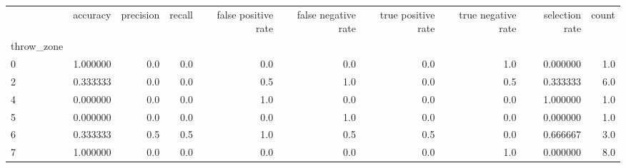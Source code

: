 \begin{tabular}{lrrrrrrrrr}
\toprule
{} &  accuracy &  precision &  recall &  false positive rate &  false negative rate &  true positive rate &  true negative rate &  selection rate &  count \\
throw\_zone &           &            &         &                      &                      &                     &                     &                 &        \\
\midrule
0          &  1.000000 &        0.0 &     0.0 &                  0.0 &                  0.0 &                 0.0 &                 1.0 &        0.000000 &    1.0 \\
2          &  0.333333 &        0.0 &     0.0 &                  0.5 &                  1.0 &                 0.0 &                 0.5 &        0.333333 &    6.0 \\
4          &  0.000000 &        0.0 &     0.0 &                  1.0 &                  0.0 &                 0.0 &                 0.0 &        1.000000 &    1.0 \\
5          &  0.000000 &        0.0 &     0.0 &                  0.0 &                  1.0 &                 0.0 &                 0.0 &        0.000000 &    1.0 \\
6          &  0.333333 &        0.5 &     0.5 &                  1.0 &                  0.5 &                 0.5 &                 0.0 &        0.666667 &    3.0 \\
7          &  1.000000 &        0.0 &     0.0 &                  0.0 &                  0.0 &                 0.0 &                 1.0 &        0.000000 &    8.0 \\
\bottomrule
\end{tabular}
